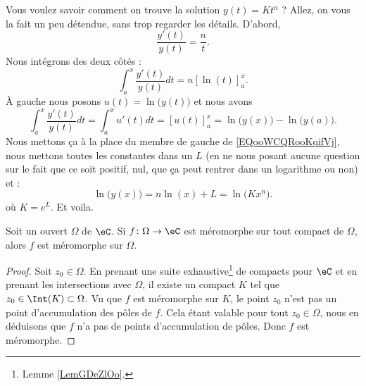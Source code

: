 \begin{normaltext}
	Vous voulez savoir comment on trouve la solution \( y(t)=Kt^n\) ? Allez, on vous la fait un peu détendue, sans trop regarder les détails. D'abord,
	\begin{equation}
		\frac{ y'(t) }{ y(t) }=\frac{ n }{ t }.
	\end{equation}
	Nous intégrons des deux côtés :
	\begin{equation}        \label{EQooWCQRooKqifVj}
		\int_a^x\frac{ y'(t) }{ y(t) }dt=n[\ln(t)]_a^x.
	\end{equation}
	À gauche nous posons \( u(t)=\ln\big( y(t) \big)\) et nous avons
	\begin{equation}
		\int_a^x\frac{ y'(t) }{ y(t) }dt=\int_a^xu'(t)dt=[u(t)]_a^x=\ln\big( y(x) \big)-\ln\big( y(a) \big).
	\end{equation}
	Nous mettons ça à la place du membre de gauche de \eqref{EQooWCQRooKqifVj}, nous mettons toutes les constantes dans un \( L\) (en ne nous posant aucune question sur le fait que ce soit positif, nul, que ça peut rentrer dans un logarithme ou non) et :
	\begin{equation}
		\ln\big( y(x) \big)=n\ln(x)+L=\ln\big( Kx^n \big).
	\end{equation}
	où \( K= e^{L}\). Et voila.
\end{normaltext}

\begin{lemma}	\label{LEMooCESMooJRqFvG}
	Soit un ouvert \( \Omega\) de \( \eC\). Si \(f \colon \Omega\to \eC  \) est méromorphe sur tout compact de \( \Omega\), alors \( f\) est méromorphe sur \( \Omega\).
\end{lemma}

\begin{proof}
	Soit \( z_0\in \Omega\). En prenant une suite exhaustive\footnote{Lemme \ref{LemGDeZlOo}.} de compacts pour \( \eC\) et en prenant les intersections avec \( \Omega\), il existe un compact \( K\) tel que \( z_0\in \Int(K)\subset  \Omega\). Vu que \( f\) est méromorphe sur \( K\), le point \( z_0\) n'est pas un point d'accumulation des pôles de \( f\). Cela étant valable pour tout \( z_0\in \Omega\), nous en déduisons que \( f\) n'a pas de points d'accumulation de pôles. Donc \( f\) est méromorphe.
\end{proof}

